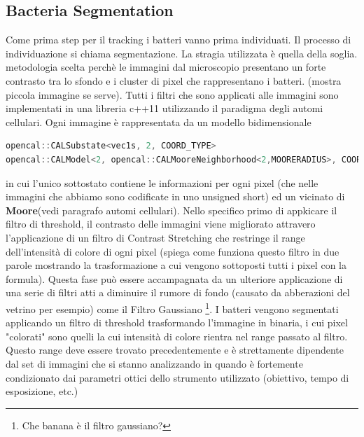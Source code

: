 \documentclass[conference]{IEEEtran}
\begin{document}
\subsection{Bacteria Segmentation}
Come prima step per il tracking i batteri vanno prima individuati. Il processo di individuazione si chiama segmentazione. La stragia utilizzata è quella della soglia. metodologia scelta perchè le immagini dal microscopio presentano un forte contrasto tra lo sfondo e i cluster di pixel che rappresentano i batteri. (mostra piccola immagine se serve). 
Tutti i filtri che sono applicati alle immagini sono implementati in una libreria c++11 utilizzando il paradigma degli automi cellulari. Ogni immagine è rappresentata da un modello bidimensionale 
\begin{lstlisting}[language=c++]
opencal::CALSubstate<vec1s, 2, COORD_TYPE>
opencal::CALModel<2, opencal::CALMooreNeighborhood<2,MOORERADIUS>, COORD_TYPE>;
\end{lstlisting}
 in cui l'unico sottostato contiene le informazioni per ogni pixel (che nelle immagini che abbiamo sono codificate in uno unsigned short) ed un vicinato di \textbf{Moore}(vedi paragrafo automi cellulari).
Nello specifico primo di appkicare il filtro di threshold, il contrasto delle immagini viene migliorato attravero l'applicazione di un filtro di Contrast Stretching che restringe il range dell'intensità di colore di ogni  pixel (spiega come funziona questo filtro in due parole mostrando la trasformazione a cui vengono sottoposti tutti i pixel con la formula).
Questa fase può essere accampagnata da un ulteriore applicazione di una  serie di filtri atti a diminuire il rumore di fondo (causato da abberazioni del vetrino per esempio) come il Filtro Gaussiano \footnote{Che banana è il filtro gaussiano?}. I batteri vengono segmentati applicando un filtro di threshold trasformando l'immagine in binaria, i cui pixel "colorati" sono quelli la cui intensità di colore rientra nel range passato al filtro. Questo range deve essere trovato precedentemente e è strettamente dipendente dal set di immagini che si stanno analizzando in quando è fortemente condizionato dai parametri ottici dello strumento utilizzato (obiettivo, tempo di esposizione, etc.)
\end{document}
